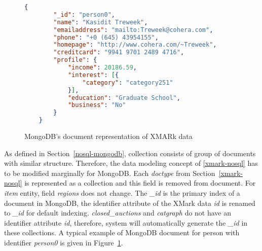 \begin{figure}
\begin{lstlisting}[language=JSON, basicstyle =\scriptsize]
	{
		"_id": "person0",
		"name": "Kasidit Treweek",
		"emailaddress": "mailto:Treweek@cohera.com",
		"phone": "+0 (645) 43954155",
		"homepage": "http://www.cohera.com/~Treweek",
		"creditcard": "9941 9701 2489 4716",
		"profile": {
			"income": 20186.59,
			"interest": [{
				"category": "category251"
			}],
			"education": "Graduate School",
			"business": "No"
		}
	}
\end{lstlisting}
\caption{MongoDB's document representation of XMARk data}
\label{code:mongodb-person0}
\end{figure}

As defined in Section~\ref{nosql-mongodb}, collection consists of group of documents with similar structure. Therefore, the data modeling concept of \ref{xmark-nosql} has to be modified marginally for MongoDB. Each \textit{doctype} from Section~\ref{xmark-nosql} is represented as a  collection and this field is removed from document.
For \textit{item} entity,  field \textit{regions} does not change. The \textit{\_id} is the primary index of a document in MongoDB, the identifier attribute of the XMark data \textit{id} is renamed to \textit{\_id} for default indexing.  \textit{closed\_auctions} and \textit{catgraph} do not have an identifier attribute \textit{id}, therefore, system will automatically generate the \textit{\_id} in these collections.
A typical example of MongoDB document for person with identifier \textit{person0} is given in Figure~\ref{code:mongodb-person0}.	
